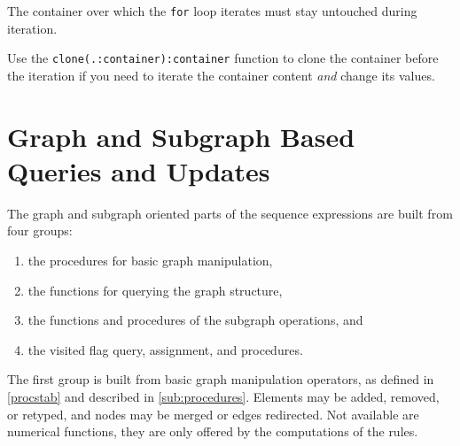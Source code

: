 \begin{warning}
The container over which the \texttt{for} loop iterates must stay untouched during iteration.

Use the \texttt{clone(.:container):container} function to clone the container before the iteration if you need to iterate the container content \emph{and} change its values.
\end{warning}



\section{Graph and Subgraph Based Queries and Updates}\label{sec:queryupdate}\label{sec:visited}

The graph and subgraph oriented parts of the sequence expressions are built from four groups:
\begin{enumerate}
	\item the procedures for basic graph manipulation,
	\item the functions for querying the graph structure,
	\item the functions and procedures of the subgraph operations, and
	\item the visited flag query, assignment, and procedures.
\end{enumerate}

The first group is built from basic graph manipulation operators, as defined in \ref{procstab} and described in \ref{sub:procedures}.
Elements may be added, removed, or retyped, and nodes may be merged or edges redirected.
Not available are numerical functions, they are only offered by the computations of the rules. 

